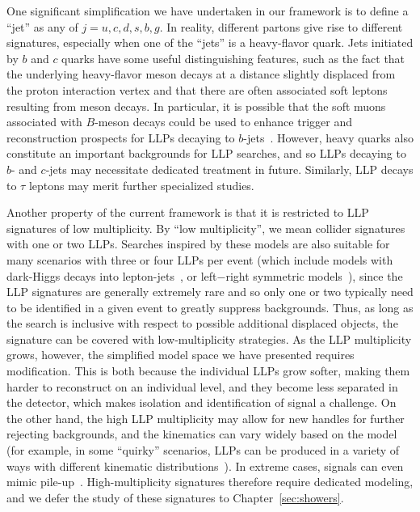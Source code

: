 One significant simplification we have undertaken in our framework is to define a ``jet'' as any of $j=u,c,d,s,b,g$.
In reality, different partons give rise to different signatures, especially when one of the ``jets'' is a heavy-flavor quark.
Jets initiated by $b$ and $c$ quarks have some useful distinguishing features, such as the fact that the underlying heavy-flavor meson decays at a distance slightly displaced from the proton interaction vertex and that there are often associated soft leptons resulting from meson decays.
In particular, it is possible that the soft muons associated with $B$-meson decays could be used to enhance trigger and reconstruction prospects for LLPs decaying to $b$-jets~\cite{Aad:2013txa}.
However, heavy quarks also constitute an important backgrounds for LLP searches, and so LLPs decaying to $b$- and $c$-jets may necessitate dedicated treatment in future.
Similarly, LLP decays to $\tau$ leptons may merit further specialized studies.

Another property of the current framework is that it is restricted to LLP signatures of low multiplicity.
By ``low multiplicity'', we mean collider signatures with one or two LLPs.
Searches inspired by these models are also suitable for many scenarios with three or four LLPs per event (which include models with dark-Higgs decays into lepton-jets~\cite{Falkowski:2010cm}, or left$-$right symmetric models~\cite{Nemevsek:2016enw}), since the LLP signatures are generally extremely rare and so only one or two typically need to be identified in a given event to greatly suppress backgrounds.
Thus, as long as the search is inclusive with respect to possible additional displaced objects, the signature can be covered with low-multiplicity strategies.
As the LLP multiplicity grows, however, the simplified model space we have presented requires modification.
This is both because the individual LLPs grow softer, making them harder to reconstruct on an individual level, and they become less separated in the detector, which makes isolation and identification of signal a challenge.
On the other hand, the high LLP multiplicity may allow for new handles for further rejecting backgrounds, and the kinematics can vary widely based on the model (for example, in some ``quirky'' scenarios, LLPs can be produced in a variety of ways with different kinematic distributions~\cite{Beauchesne:2017ukw}). 
In extreme cases, signals can even mimic pile-up~\cite{Knapen:2016hky}.
High-multiplicity signatures therefore require dedicated modeling, and we defer the study of these signatures to Chapter~\ref{sec:showers}.


